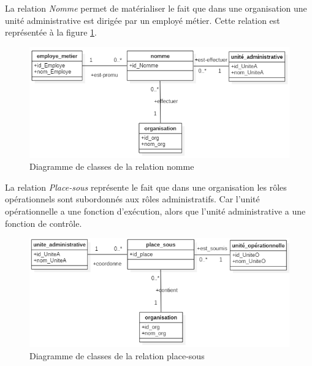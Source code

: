 \label{sectionEmployeUniteA}

La relation \textit{Nomme} permet de matérialiser le fait que dans une organisation une unité administrative est dirigée par un employé métier. Cette relation est représentée à la figure \ref{fignomme}.

\begin{figure}[h!]
    \centering
		\includegraphics[scale=0.7]{chap3/images/nomme.png}
    \caption{Diagramme de classes de la relation nomme}
	 \label{fignomme}
\end{figure} 

\label{sectionUnitéOUniteA}

La relation \textit{Place-sous} représente le fait que dans une organisation les rôles opérationnels sont subordonnés aux rôles administratifs. Car l'unité opérationnelle a une fonction d'exécution, alors que l'unité administrative a une fonction de contrôle.

\begin{figure}[h!]
    \centering
		\includegraphics[scale=0.7]{chap3/images/place-sous.png}
    \caption{Diagramme de classes de la relation place-sous}
	 \label{figplace-sous}
\end{figure} 

\label{sectionUnitéAUniteA}

